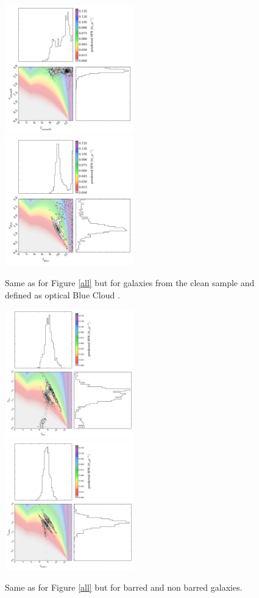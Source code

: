 \documentclass{mn2e}
\begin{document}
\begin{figure}
\includegraphics[width=0.4975\textwidth]{blue_c_smooth_clean.pdf}
\includegraphics[width=0.4975\textwidth]{blue_c_disc_clean.pdf}
\caption{Same as for Figure \ref{all} but for galaxies from the clean sample and defined as optical Blue Cloud \cite{Baldry}.}
\label{blue_c_clean}
\end{figure}

\begin{figure}
\includegraphics[width=0.4975\textwidth]{bars.pdf}
\includegraphics[width=0.4975\textwidth]{no_bars.pdf}
\caption{Same as for Figure \ref{all} but for barred and non barred galaxies.}
\label{bars}
\end{figure}
\end{document}
